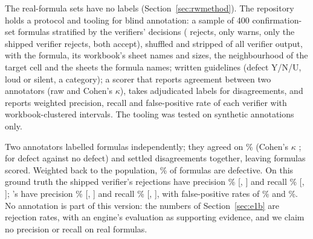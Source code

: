 The real-formula sets have no labels (Section~\ref{sec:rwmethod}). The repository holds a protocol and tooling for blind annotation: a sample of 400 confirmation-set formulas stratified by the verifiers' decisions (\gc{} rejects, \gc{} only warns, only the shipped verifier rejects, both accept), shuffled and stripped of all verifier output, with the formula, its workbook's sheet names and sizes, the neighbourhood of the target cell and the sheets the formula names; written guidelines (defect Y/N/U, loud or silent, a category); a scorer that reports agreement between two annotators (raw and Cohen's $\kappa$), takes adjudicated labels for disagreements, and reports weighted precision, recall and false-positive rate of each verifier with workbook-clustered intervals. The tooling was tested on synthetic annotations only.

\ifdefined\annN
Two annotators labelled \annOf{} formulas independently; they agreed on \annAgree\% (Cohen's $\kappa$ \annKappa{}; \annKappaYN{} for defect against no defect) and settled \annDisagree{} disagreements together, leaving \annN{} formulas scored. Weighted back to the population, \annPrevalence\% of formulas are defective. On this ground truth the shipped verifier's rejections have precision \annVoneP\% [\annVonePLo, \annVonePHi] and recall \annVoneR\% [\annVoneRLo, \annVoneRHi]; \gc's have precision \annVtwoP\% [\annVtwoPLo, \annVtwoPHi] and recall \annVtwoR\% [\annVtwoRLo, \annVtwoRHi], with false-positive rates of \annVoneF\% and \annVtwoF\%.
\else
No annotation is part of this version: the numbers of Section~\ref{sec:e1b} are rejection rates, with an engine's evaluation as supporting evidence, and we claim no precision or recall on real formulas.
\fi
